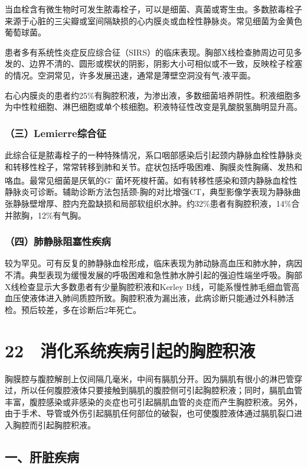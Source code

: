 当血栓含有微生物时可发生脓毒栓子，可以是细菌、真菌或寄生虫。多数脓毒栓子来源于心脏的三尖瓣或室间隔缺损的心内膜炎或血栓性静脉炎。常见细菌为金黄色葡萄球菌。

患者多有系统性炎症反应综合征（SIRS）的临床表现。胸部X线检查肺周边可见多发的、边界不清的、圆形或楔状的阴影，阴影大小可相似或不一致，反映栓子栓塞的情况。空洞常见，许多发展迅速，通常是薄壁空洞没有气-液平面。

右心内膜炎的患者约25\%有胸腔积液，为渗出液，多数细菌培养阴性。积液细胞多为中性粒细胞、淋巴细胞或单个核细胞。积液特征性改变是乳酸脱氢酶明显升高。

\subsubsection{（三）Lemierre综合征}

此综合征是脓毒栓子的一种特殊情况，系口咽部感染后引起颈内静脉血栓性静脉炎和转移性栓子，常常转移到肺和关节。症状包括呼吸困难、胸膜炎性胸痛、发热和咯血。最常见细菌是厌氧的G\textsuperscript{-}
菌坏死梭杆菌。如有转移性感染和颈内静脉血栓性静脉炎可诊断。辅助诊断方法包括颈-胸的对比增强CT，典型影像学表现为静脉曲张静脉壁增厚、腔内充盈缺损和局部软组织水肿。约32\%患者有胸腔积液，14\%合并脓胸，12\%有气胸。

\subsubsection{（四）肺静脉阻塞性疾病}

较为罕见。可有反复的肺静脉血栓形成，临床表现为肺动脉高血压和肺水肿，病因不清。典型表现为缓慢发展的呼吸困难和急性肺水肿引起的强迫性端坐呼吸。胸部X线检查显示大多数患者有少量胸腔积液和Kerley
B线，可能系慢性肺毛细血管高血压使液体进入肺间质腔所致。胸腔积液为漏出液，此病诊断只能通过外科肺活检。预后较差，多在诊断后2年死亡。

\protect\hypertarget{text00074.html}{}{}

\section{22　消化系统疾病引起的胸腔积液}

胸膜腔与腹腔解剖上仅间隔几毫米，中间有膈肌分开。因为膈肌有很小的淋巴管穿过，所以任何腹腔液体只要接触到膈肌的腹腔侧可引起胸腔积液；同时，膈肌血管丰富，腹腔感染或非感染的炎症也可引起膈肌血管的炎症而产生胸腔积液。另外，由于手术、导管或外伤引起膈肌任何部位的破裂，也可使腹腔液体通过膈肌裂口进入胸腔而引起胸腔积液。

\subsection{一、肝脏疾病}


